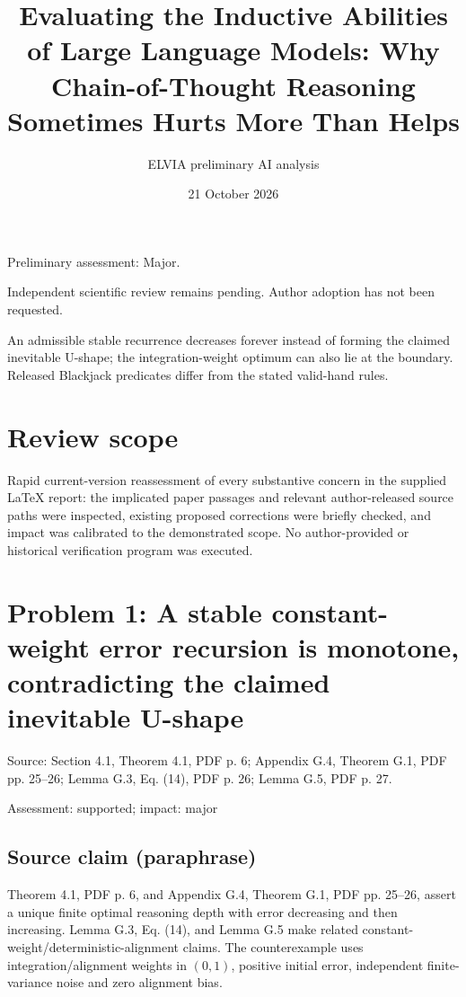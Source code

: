 \documentclass[11pt]{article}
\begin{document}
\title{Evaluating the Inductive Abilities of Large Language Models: Why Chain-of-Thought Reasoning Sometimes Hurts More Than Helps}

\author{ELVIA preliminary AI analysis}\date{21 October 2026}\maketitle

Preliminary assessment: Major.\par

Independent scientific review remains pending. Author adoption has not been requested.

An admissible stable recurrence decreases forever instead of forming the claimed inevitable U-shape; the integration-weight optimum can also lie at the boundary. Released Blackjack predicates differ from the stated valid-hand rules.

\section*{Review scope}

Rapid current-version reassessment of every substantive concern in the supplied LaTeX report: the implicated paper passages and relevant author-released source paths were inspected, existing proposed corrections were briefly checked, and impact was calibrated to the demonstrated scope. No author-provided or historical verification program was executed.

\section*{Problem 1: A stable constant-weight error recursion is monotone, contradicting the claimed inevitable U-shape}

Source: Section 4.1, Theorem 4.1, PDF p. 6; Appendix G.4, Theorem G.1, PDF pp. 25–26; Lemma G.3, Eq. (14), PDF p. 26; Lemma G.5, PDF p. 27.

Assessment: supported; impact: major

\subsection*{Source claim (paraphrase)}

Theorem 4.1, PDF p. 6, and Appendix G.4, Theorem G.1, PDF pp. 25–26, assert a unique finite optimal reasoning depth with error decreasing and then increasing. Lemma G.3, Eq. (14), and Lemma G.5 make related constant-weight/deterministic-alignment claims. The counterexample uses integration/alignment weights in \((0,1)\), positive initial error, independent finite-variance noise and zero alignment bias.
\end{document}
